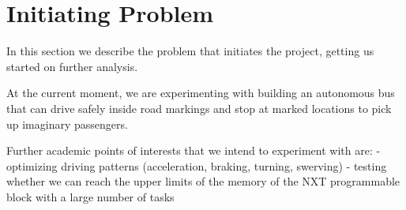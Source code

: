 \section{Initiating Problem}

In this section we describe the problem that initiates the project, getting us started on further analysis. 

At the current moment, we are experimenting with building an autonomous bus that can drive safely inside road markings and stop at marked locations to pick up imaginary passengers. 

Further academic points of interests that we intend to experiment with are:
- optimizing driving patterns (acceleration, braking, turning, swerving)
- testing whether we can reach the upper limits of the memory of the NXT programmable block with a large number of tasks


